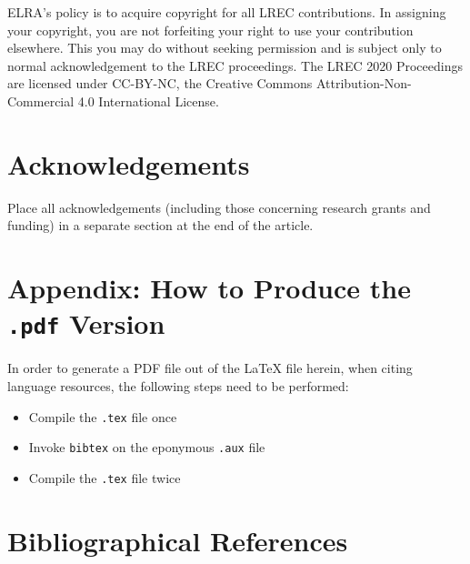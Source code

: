 \documentclass[10pt, a4paper]{article}
\begin{document}
ELRA's policy is to acquire copyright for all LREC contributions. In assigning
your copyright, you are not forfeiting your right to use your contribution
elsewhere. This you may do without seeking permission and is subject only to
normal acknowledgement to the LREC proceedings. The LREC 2020 Proceedings are
licensed under CC-BY-NC, the Creative Commons Attribution-Non-Commercial 4.0
International License.

\section{Acknowledgements}

Place all acknowledgements (including those concerning research grants and
funding) in a separate section at the end of the article.


\section*{Appendix: How to Produce the \texttt{.pdf} Version}

In order to generate a PDF file out of the LaTeX file herein, when citing
language resources, the following steps need to be performed:

\begin{itemize}
    \item{Compile the \texttt{.tex} file once}
    \item{Invoke \texttt{bibtex} on the eponymous \texttt{.aux} file}
    \item{Compile the \texttt{.tex} file twice}
\end{itemize}

\section{Bibliographical References}\label{main:ref}





\end{document}
